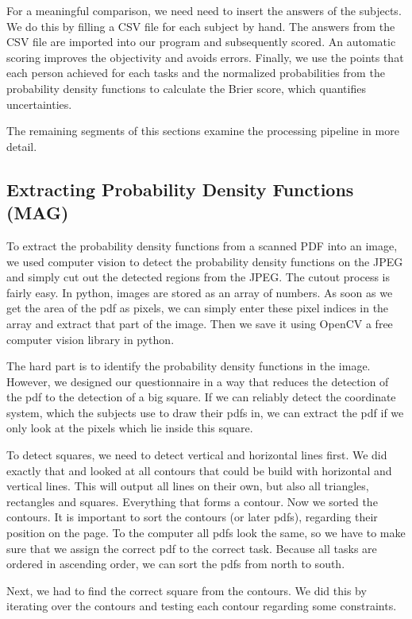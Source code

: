 \documentclass[../main/main.tex]{subfiles}
\begin{document}
	For a meaningful comparison, we need need to insert the answers of the subjects. We do this by filling a CSV file for each subject by hand. The answers from the CSV file are imported into our program and subsequently scored. An automatic scoring improves the objectivity and avoids errors. Finally, we use the points that each person achieved for each tasks and the normalized probabilities from the probability density functions to calculate the Brier score, which quantifies uncertainties.
	
	The remaining segments of this sections examine the processing pipeline in more detail.
	
	
	\subsection{Extracting Probability Density Functions (MAG)}
	
	To extract the probability density functions from a scanned PDF into an image, we used computer vision to detect the probability density functions on the JPEG and simply cut out the detected regions from the JPEG. The cutout process is fairly easy. In python, images are stored as an array of numbers. As soon as we get the area of the pdf as pixels, we can simply enter these pixel indices in the array and extract that part of the image. Then we save it using OpenCV a free computer vision library in python.
	
	The hard part is to identify the probability density functions in the image. However, we designed our questionnaire in a way that reduces the detection of the pdf to the detection of a big square. If we can reliably detect the coordinate system, which the subjects use to draw their pdfs in, we can extract the pdf if we only look at the pixels which lie inside this square.
	
	To detect squares, we need to detect vertical and horizontal lines first. We did exactly that and looked at all contours that could be build with horizontal and vertical lines. This will output all lines on their own, but also all triangles, rectangles and squares. Everything that forms a contour. Now we sorted the contours. It is important to sort the contours (or later pdfs), regarding their position on the page. To the computer all pdfs look the same, so we have to make sure that we assign the correct pdf to the correct task. Because all tasks are ordered in ascending order, we can sort the pdfs from north to south.
	
	Next, we had to find the correct square from the contours. We did this by iterating over the contours and testing each contour regarding some constraints.
	
\end{document}
